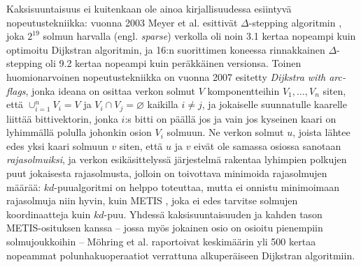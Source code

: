 \documentclass[10pt]{article}
\begin{document}
\noindent Kaksisuuntaisuus ei kuitenkaan ole ainoa kirjallisuudessa esiintyvä nopeutustekniikka: vuonna 2003 Meyer et al. esittivät $\Delta$-stepping algoritmin \cite{Meyer98}, joka $2^{19}$ solmun harvalla (engl. \textit{sparse}) verkolla oli noin 3.1 kertaa nopeampi kuin optimoitu Dijkstran algoritmin, ja 16:n suorittimen koneessa rinnakkainen $\Delta$-stepping oli 9.2 kertaa nopeampi kuin peräkkäinen versionsa. Toinen huomionarvoinen nopeutustekniikka on vuonna 2007 esitetty \textit{Dijkstra with arc-flags}\cite{Mohring07}, jonka ideana on osittaa verkon solmut $V$ komponentteihin $V_1, \dots, V_n$ siten, että $\cup_{i = 1}^n V_i = V$ ja $V_i \cap V_j = \varnothing$ kaikilla $i \neq j$, ja jokaiselle suunnatulle kaarelle liittää bittivektorin, jonka $i$:s bitti on päällä jos ja vain jos kyseinen kaari on lyhimmällä polulla johonkin osion $V_i$ solmuun. Ne verkon solmut $u$, joista lähtee edes yksi kaari solmuun $v$ siten, että $u$ ja $v$ eivät ole samassa osiossa sanotaan \textit{rajasolmuiksi}, ja verkon esikäsittelyssä järjestelmä rakentaa lyhimpien polkujen puut jokaisesta rajasolmusta, jolloin on toivottava minimoida rajasolmujen määrää: $kd$-puualgoritmi on helppo toteuttaa, mutta ei onnistu minimoimaan rajasolmuja niin hyvin, kuin METIS \cite{Karypis98}, joka ei edes tarvitse solmujen koordinaatteja kuin $kd$-puu. Yhdessä kaksisuuntaisuuden ja kahden tason METIS-osituksen kanssa -- jossa myös jokainen osio on osioitu pienempiin solmujoukkoihin -- Möhring et al. raportoivat keskimäärin yli 500 kertaa nopeammat polunhakuoperaatiot verrattuna alkuperäiseen Dijkstran algoritmiin.




\end{document}
